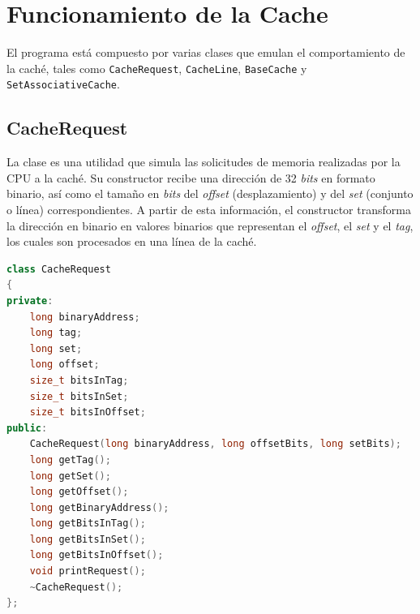 \documentclass[12pt]{article}
\begin{document}
\section*{Funcionamiento de la Cache}
\vspace{-5pt}
El programa está compuesto por varias clases que emulan el comportamiento de la caché, tales como \lstinline|CacheRequest|, \lstinline|CacheLine|, \lstinline|BaseCache| y \lstinline|SetAssociativeCache|.
%
\subsection*{CacheRequest}
\vspace{-5pt}
La clase es una utilidad que simula las solicitudes de memoria realizadas por la CPU a la caché. Su constructor recibe una dirección de 32 \textit{bits} en formato binario, así como el tamaño en \textit{bits} del \textit{offset} (desplazamiento) y del \textit{set} (conjunto o línea) correspondientes. A partir de esta información, el constructor transforma la dirección en binario en valores binarios que representan el \textit{offset}, el \textit{set} y el \textit{tag}, los cuales son procesados en una línea de la caché.
\vspace{5pt}
\begin{lstlisting}[language=C++, caption={Declaración de la Clase \lstinline|CacheRequest|}]
class CacheRequest
{
private:
	long binaryAddress;
	long tag;
	long set;
	long offset;
	size_t bitsInTag;
	size_t bitsInSet;
	size_t bitsInOffset;
public:
	CacheRequest(long binaryAddress, long offsetBits, long setBits);
	long getTag();
	long getSet();
	long getOffset();
	long getBinaryAddress();
	long getBitsInTag();
	long getBitsInSet();
	long getBitsInOffset();
	void printRequest();
	~CacheRequest();
};
\end{lstlisting}
\newpage
%
\end{document}
